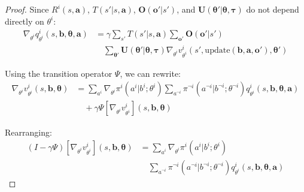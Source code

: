 \begin{proof}
    Since $R^{i}(s, \boldsymbol{a})$, $T(s'|s, \boldsymbol{a})$, $\boldsymbol{O}(\boldsymbol
        {o}'|s')$, and
    $\boldsymbol{U}(\boldsymbol{\theta}'|\boldsymbol{\theta}, \boldsymbol{\tau})$
    do not depend directly on $\theta^{i}$:
    \begin{align}
        \nabla_{\theta^i}q^{i}_{\theta^i}(s, \boldsymbol{b}, \boldsymbol{\theta}, \boldsymbol{a}) & = \gamma \sum_{s'}T(s'|s, \boldsymbol{a}) \sum_{\boldsymbol{o}'}\boldsymbol{O}(\boldsymbol{o}'|s') \nonumber                                                                                                                             \\
                                                                                                  & \quad \sum_{\boldsymbol{\theta}'}\boldsymbol{U}(\boldsymbol{\theta}'|\boldsymbol{\theta}, \boldsymbol{\tau}) \nabla_{\theta^i}v^{i}_{\theta^i}(s', \text{update}(\boldsymbol{b}, \boldsymbol{a}, \boldsymbol{o}'), \boldsymbol{\theta}')
    \end{align}

    Using the transition operator $\Psi$, we can rewrite:
    \begin{align}
        \nabla_{\theta^i}v^{i}_{\theta^i}(s, \boldsymbol{b}, \boldsymbol{\theta}) & = \sum_{a^i}\nabla_{\theta^i}\pi^{i}(a^{i}|b^{i}; \theta^{i}) \sum_{a^{\neg i}}\pi^{\neg i}(a^{\neg i}|b^{\neg i}; \theta^{\neg i}) q^{i}_{\theta^i}(s, \boldsymbol{b}, \boldsymbol{\theta}, \boldsymbol{a}) \nonumber \\
                                                                                  & \quad + \gamma \Psi[\nabla_{\theta^i}v^{i}_{\theta^i}](s, \boldsymbol{b}, \boldsymbol{\theta})
    \end{align}

    Rearranging:
    \begin{align}
        (I - \gamma \Psi)[\nabla_{\theta^i}v^{i}_{\theta^i}](s, \boldsymbol{b}, \boldsymbol{\theta}) & = \sum_{a^i}\nabla_{\theta^i}\pi^{i}(a^{i}|b^{i}; \theta^{i}) \nonumber                                                                              \\
                                                                                                     & \quad \sum_{a^{\neg i}}\pi^{\neg i}(a^{\neg i}|b^{\neg i}; \theta^{\neg i}) q^{i}_{\theta^i}(s, \boldsymbol{b}, \boldsymbol{\theta}, \boldsymbol{a})
    \end{align}


\end{proof}
